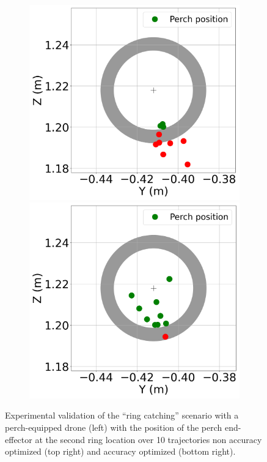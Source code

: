 \begin{figure} [t]
\begin{subfigure}{0.37\linewidth}
        \includegraphics[width=\linewidth]{figures/robust_accurate/Exp_ring_no_opti_full_zoom.png}
        \includegraphics[width=\linewidth]{figures/robust_accurate/Exp_ring_opti_full_zoom.png}
      \end{subfigure}\hfill
      
    \caption{Experimental validation of the ``ring catching'' scenario with a perch-equipped drone (left) with the position of the perch end-effector at the second ring location over 10 trajectories non accuracy optimized (top right) and accuracy optimized (bottom right).}
    \label{fig: exp ring}
  \end{figure}

